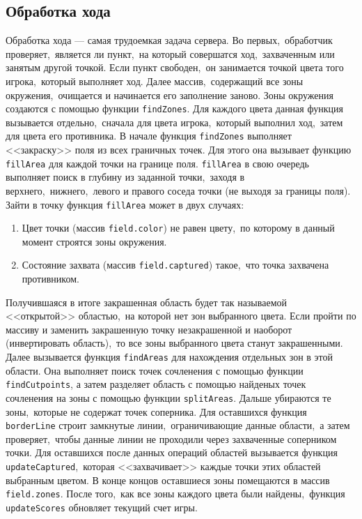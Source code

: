 \documentclass[14pt,a4paper]{report}
\begin{document}
\subsection{Обработка хода}
Обработка хода --- самая трудоемкая задача сервера. Во первых,~обработчик проверяет,~является ли пункт,~на который совершатся ход,~захваченным или занятым другой точкой. Если пункт свободен,~он занимается точкой цвета того игрока,~который выполняет ход. Далее массив,~содержащий все зоны окружения,~очищается и начинается его заполнение заново. Зоны окружения создаются с помощью функции \lstinline$findZones$. Для каждого цвета данная функция вызывается отдельно,~сначала для цвета игрока,~который выполнил ход,~затем для цвета его противника. В начале функция \lstinline$findZones$ выполняет <<закраску>> поля из всех граничных точек. Для этого она вызывает функцию \lstinline$fillArea$ для каждой точки на границе поля. \lstinline$fillArea$ в свою очередь выполняет поиск в глубину из заданной точки,~заходя в верхнего,~нижнего,~левого и правого соседа точки (не выходя за границы поля). Зайти в точку функция \lstinline$fillArea$ может в двух случаях: 
\begin{enumerate}
\item Цвет точки (массив \lstinline$field.color$) не равен цвету,~по которому в данный момент строятся зоны окружения.
\item Состояние захвата (массив \lstinline$field.captured$) такое,~что точка захвачена противником.
\end{enumerate}

Получившаяся в итоге закрашенная область будет так называемой <<открытой>> областью,~на которой нет зон выбранного цвета. Если пройти по массиву и заменить закрашенную точку незакрашенной и наоборот (инвертировать область),~то все зоны выбранного цвета станут закрашенными. Далее вызывается функция \lstinline$findAreas$ для нахождения отдельных зон в этой области. Она выполняет поиск точек сочленения с помощью функции \mbox{\lstinline$findCutpoints$,} а затем разделяет область с помощью найденых точек сочленения на зоны с помощью функции \lstinline$splitAreas$. Дальше убираются те зоны,~которые не содержат точек соперника. Для оставшихся функция \lstinline$borderLine$ строит замкнутые линии,~ограничивающие данные области,~а затем проверяет,~чтобы данные линии не проходили через захваченные соперником точки. Для оставшихся после данных операций областей вызывается функция \lstinline$updateCaptured$,~которая <<захвачивает>> каждые точки этих областей выбранным цветом. В конце концов оставшиеся зоны помещаются в массив \lstinline$field.zones$. После того,~как все зоны каждого цвета были найдены,~функция \lstinline$updateScores$ обновляет текущий счет игры.
\end{document}
